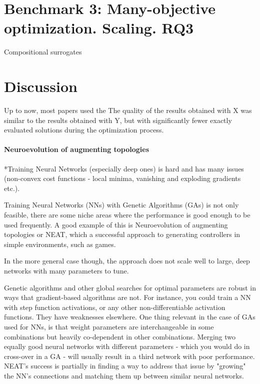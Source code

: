 \section{Benchmark 3: Many-objective optimization. Scaling. RQ3}
    Compositional surrogates


\section{Discussion}

Up to now, most papers used the
The quality of the results obtained with X was similar to the results obtained with Y, but with significantly fewer exactly evaluated solutions during the optimization process. 


\paragraph{Neuroevolution of augmenting topologies}
 *Training Neural Networks (especially deep ones) is hard and has many issues (non-convex cost functions - local minima, vanishing and exploding gradients etc.).

 Training Neural Networks (NNs) with Genetic Algorithms (GAs) is not only feasible, there are some niche areas where the performance is good enough to be used frequently. A good example of this is Neuroevolution of augmenting topologies or NEAT, which a successful approach to generating controllers in simple environments, such as games.

 In the more general case though, the approach does not scale well to large, deep networks with many parameters to tune.

 Genetic algorithms and other global searches for optimal parameters are robust in ways that gradient-based algorithms are not. For instance, you could train a NN with step function activations, or any other non-differentiable activation functions. They have weaknesses elsewhere. One thing relevant in the case of GAs used for NNs, is that weight parameters are interchangeable in some combinations but heavily co-dependent in other combinations. Merging two equally good neural networks with different parameters - which you would do in cross-over in a GA - will usually result in a third network with poor performance. NEAT's success is partially in finding a way to address that issue by "growing" the NN's connections and matching them up between similar neural networks.

